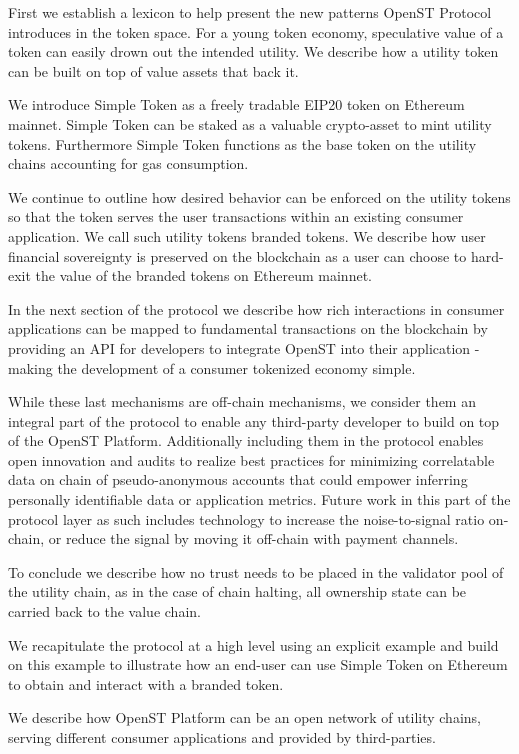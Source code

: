 \documentclass[12pt,a4paper, twocolumn]{article}
\begin{document}
First we establish a lexicon to help present the new patterns OpenST Protocol introduces in the token space.  For a young token economy, speculative value of a token can easily drown out the intended utility.  We describe how a utility token can be built on top of value assets that back it.\par
We introduce Simple Token as a freely tradable EIP20 token on Ethereum mainnet.  Simple Token can be staked as a valuable crypto-asset to mint utility tokens.  Furthermore  Simple Token functions as the base token on the utility chains accounting for gas consumption. \par
We continue to outline how desired behavior can be enforced on the utility tokens so that the token serves the user transactions within an existing consumer application.  We call such utility tokens branded tokens.  We describe how user financial sovereignty is preserved on the blockchain as a user can choose to hard-exit the value of the branded tokens on Ethereum mainnet. \par
In the next section of the protocol we describe how rich interactions in consumer applications can be mapped to fundamental transactions on the blockchain by providing an API for developers to integrate OpenST into their application - making the development of a consumer tokenized economy simple. \par
While these last mechanisms are off-chain mechanisms, we consider them an integral part of the protocol to enable any third-party developer to build on top of the OpenST Platform.  Additionally including them in the protocol enables open innovation and audits to realize best practices for minimizing correlatable data on chain of pseudo-anonymous accounts that could empower inferring personally identifiable data or application metrics.  Future work in this part of the protocol layer as such includes technology to increase the noise-to-signal ratio on-chain, or reduce the signal by moving it off-chain with payment channels. \par
To conclude we describe how no trust needs to be placed in the validator pool of the utility chain, as in the case of chain halting, all ownership state can be carried back to the value chain.\par
We recapitulate the protocol at a high level using an explicit example and build on this example to illustrate how an end-user can use Simple Token on Ethereum to obtain and interact with a branded token.\par
We describe how OpenST Platform can be an open network of utility chains, serving different consumer applications and provided by third-parties.\par
\end{document}
